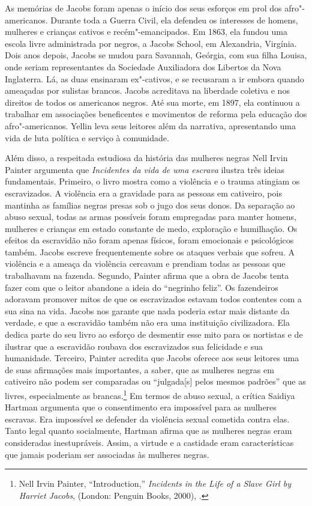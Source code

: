 As memórias de Jacobs foram apenas o início dos seus esforços em prol
dos afro"-americanos. Durante toda a Guerra Civil, ela defendeu os
interesses de homens, mulheres e crianças cativos e
recém"-emancipados. Em 1863, ela fundou uma escola livre administrada por
negros, a Jacobs School, em Alexandria, Virgínia. Dois anos depois,
Jacobs se mudou para Savannah, Geórgia, com sua filha Louisa, onde
seriam representantes da Sociedade Auxiliadora dos Libertos da Nova
Inglaterra. Lá, as duas ensinaram ex"-cativos, e se recusaram a ir
embora quando ameaçadas por sulistas brancos. Jacobs acreditava na
liberdade coletiva e nos direitos de todos os americanos negros. Até sua
morte, em 1897, ela continuou a trabalhar em associações beneficentes e
movimentos de reforma pela educação dos afro"-americanos. Yellin leva
seus leitores além da narrativa, apresentando uma vida de luta política e
serviço à comunidade.

Além disso, a respeitada estudiosa da história das mulheres negras Nell
Irvin Painter argumenta que \emph{Incidentes da vida de uma escrava}
ilustra três ideias fundamentais. Primeiro, o livro mostra como a
violência e o trauma atingiam os escravizados. A violência era a
gravidade para as pessoas em cativeiro, pois
mantinha as famílias negras presas sob o jugo dos seus donos. Da
separação ao abuso sexual, todas as armas possíveis foram empregadas
para manter homens, mulheres e crianças em estado constante de medo,
exploração e humilhação. Os efeitos da escravidão não foram apenas
físicos, foram emocionais e psicológicos também. Jacobs escreve
frequentemente sobre os ataques verbais que sofreu. A violência e a
ameaça da violência cercavam e prendiam todas as pessoas que trabalhavam
na fazenda. Segundo, Painter afirma que a obra de Jacobs tenta fazer com
que o leitor abandone a ideia do ``negrinho feliz''. Os fazendeiros
adoravam promover mitos de que os escravizados estavam todos contentes com a
sua sina na vida. Jacobs nos garante que nada poderia estar mais
distante da verdade, e que a escravidão também não era uma instituição
civilizadora. Ela dedica parte do seu livro ao esforço de desmentir esse
mito para os nortistas e de ilustrar que a escravidão roubava dos
escravizados sua felicidade e sua humanidade. Terceiro, Painter acredita
que Jacobs oferece aos seus leitores uma de suas afirmações mais
importantes, a saber, que as mulheres negras em cativeiro não podem ser
comparadas ou ``julgada{[}s{]} pelos mesmos padrões'' que as livres,
especialmente as brancas.\footnote{Nell Irvin Painter, ``Introduction,''
  \emph{Incidents in the Life of a Slave Girl by Harriet Jacobs},
  (London: Penguin Books, 2000), .} Em termos de abuso sexual, a
crítica Saidiya Hartman argumenta que o consentimento era impossível
para as mulheres escravas. Era impossível se defender da violência
sexual cometida contra elas. Tanto legal quanto socialmente, Hartman
afirma que as mulheres negras eram consideradas inestupráveis. Assim, a
virtude e a castidade eram características que jamais poderiam ser
associadas às mulheres negras.

